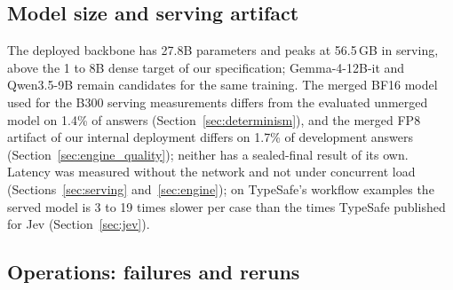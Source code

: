 \subsection{Model size and serving artifact}

The deployed backbone has 27.8B parameters and peaks at 56.5\,GB in serving, above the 1 to
8B dense target of our specification; Gemma-4-12B-it and Qwen3.5-9B remain candidates for the
same training. The merged BF16 model used for the B300 serving measurements differs from the
evaluated unmerged model on 1.4\% of answers (Section~\ref{sec:determinism}), and the merged FP8
artifact of our internal deployment differs on 1.7\% of development answers
(Section~\ref{sec:engine_quality}); neither has a sealed-final result of its own. Latency was measured without the network and not under
concurrent load (Sections~\ref{sec:serving} and~\ref{sec:engine}); on TypeSafe's workflow
examples the served model is 3 to 19 times slower per case than the times TypeSafe published
for Jev (Section~\ref{sec:jev}).

\subsection{Operations: failures and reruns}
\label{sec:ops}

